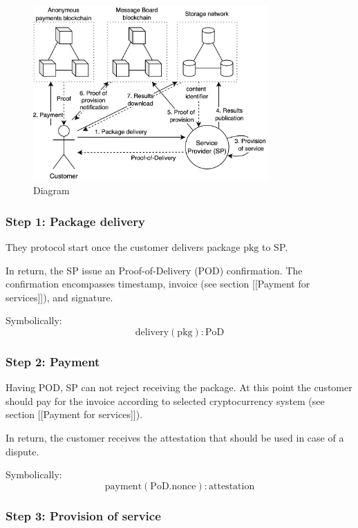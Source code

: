 \documentclass{ieeeaccess}
\begin{document}
\begin{figure}[h!]
\includegraphics[width=9cm]{anonser-diagram.png}
\centering
\caption{Diagram}
\label{fig:diagram}
\end{figure}

\subsubsection{Step 1: Package delivery}\label{step-1-package-delivery}

They protocol start once the customer delivers package \(\mathrm{pkg}\)
to SP.

In return, the SP issue an Proof-of-Delivery (POD) confirmation. The
confirmation encompasses timestamp, invoice (see section {[}{[}Payment
for services{]}{]}), and signature.

Symbolically: \[
\mathrm{delivery}(\mathrm{pkg}) : \mathrm{PoD}
\]

\subsubsection{Step 2: Payment}\label{step-2-payment}

Having POD, SP can not reject receiving the package. At this point the
customer should pay for the invoice according to selected cryptocurrency
system (see section {[}{[}Payment for services{]}{]}).

In return, the customer receives the attestation that should be used in
case of a dispute.

Symbolically: \[
\mathrm{payment}(\mathrm{PoD}.\mathrm{nonce}) : \mathrm{attestation}
\]

\subsubsection{Step 3: Provision of
service}\label{step-3-provision-of-service}
\end{document}
